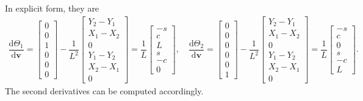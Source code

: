 \documentclass[11pt]{article}
\begin{document}
In explicit form, they are
\begin{gather}
\dfrac{\mathrm{d}\Theta_1}{\mathrm{d}\mathbf{v}}=\begin{bmatrix}
0\\0\\1\\0\\0\\0
\end{bmatrix}-\dfrac{1}{L^2}\begin{bmatrix}
Y_2-Y_1\\X_1-X_2\\0\\Y_1-Y_2\\X_2-X_1\\0
\end{bmatrix}=\dfrac{1}{L}\begin{bmatrix}
-s\\c\\L\\s\\-c\\0
\end{bmatrix},\quad
\dfrac{\mathrm{d}\Theta_2}{\mathrm{d}\mathbf{v}}=\begin{bmatrix}
0\\0\\0\\0\\0\\1
\end{bmatrix}-\dfrac{1}{L^2}\begin{bmatrix}
Y_2-Y_1\\X_1-X_2\\0\\Y_1-Y_2\\X_2-X_1\\0
\end{bmatrix}=\dfrac{1}{L}\begin{bmatrix}
-s\\c\\0\\s\\-c\\L
\end{bmatrix}.
\end{gather}
The second derivatives can be computed accordingly.
\end{document}
